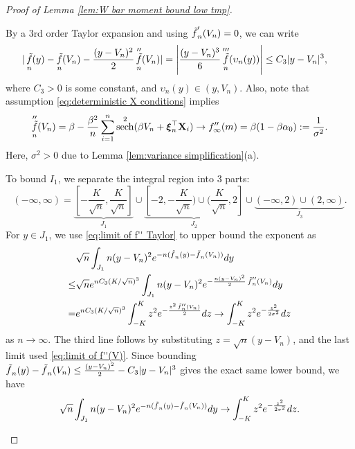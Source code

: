 \documentclass[preprint,reqno]{imsart}
\DeclareMathOperator{\ft}{\tilde{\mathnormal f}}
\DeclareMathOperator{\sech}{sech}
\newcommand{\X}{\mathbf{X}}
\newcommand{\xxi}{\boldsymbol \xi}
\DeclareMathOperator{\sumin}{\sum_{\mathnormal i=1}^{\mathnormal n}}
\begin{document}
\begin{appendix}
\begin{proof}[Proof of Lemma \ref{lem:W bar moment bound low tmp}]
\begin{enumerate}[(a)]
    By a 3rd order Taylor expansion and using $\ft_n'(V_n) = 0$, we can write
    \begin{align}\label{eq:limit of f'' Taylor}
        |\ft_n(y) - \ft_n(V_n) - \frac{(y-V_n)^2}{2} \ft_n''(V_n)| &= \left| \frac{(y-V_n)^3}{6} \ft_n'''(\upsilon_n(y)) \right| \le C_3 {|y-V_n|^3},
    \end{align}
    where $C_3 >0$ is some constant, and $\upsilon_n(y) \in (y, V_n)$.
    Also, note that assumption \eqref{eq:deterministic X conditions} implies 
    \begin{align}\label{eq:limit of f''(V)}
        \ft_n''(V_n) = \beta - \frac{\beta^2}{n} \sumin \sech^2(\beta V_n + \xxi_n^\top \X_i) \to f_{\infty}''(m) = \beta (1- \beta \alpha_0) := \frac{1}{\sigma^2}.
    \end{align} Here, $\sigma^2 > 0$ due to Lemma \ref{lem:variance simplification}(a).
    
    To bound $I_1$, we separate the integral region into 3 parts:
    $$(-\infty, \infty) = \underbrace{[-\frac{K}{\sqrt{n}},\frac{K}{\sqrt{n}}]}_{J_1} \cup \underbrace{[-2, -\frac{K}{\sqrt{n}}) \cup (\frac{K}{\sqrt{n}}, 2]}_{J_2} \cup \underbrace{(-\infty, 2) \cup (2, \infty)}_{J_3}.$$
    For $y \in J_1$, we use \eqref{eq:limit of f'' Taylor} to upper bound the exponent as
    \begin{align*}
        &\sqrt{n} \int_{J_1} n(y - V_n)^2 e^{-n(\ft_n(y) - \ft_n(V_n))} dy \\
        \le & \sqrt{n} e^{n C_3 (K/\sqrt{n})^3 } \int_{J_1} n(y - V_n)^2 e^{-\frac{n(y - V_n)^2}{2} \ft_n''(V_n)} dy \\
        =& e^{n C_3 (K/\sqrt{n})^3 } \int_{-K}^{K} z^2 e^{- \frac{z^2 \ft_n''(V_n)}{2}} dz \to \int_{-K}^{K} z^2 e^{- \frac{z^2 }{2 \sigma^2}} dz
    \end{align*}
    as $n \to \infty$.
    The third line follows by substituting $z = \sqrt{n}(y-V_n)$, and the last limit used \eqref{eq:limit of f''(V)}. Since bounding
    $\ft_n(y) - \ft_n(V_n) \le \frac{(y - V_n)^2}{2} - C_3 |y - V_n|^3$ gives the exact same lower bound, we have
    \begin{equation}\label{eq:integral J_1}
        \sqrt{n} \int_{J_1} n(y - V_n)^2 e^{-n(\ft_n(y) - \ft_n(V_n))} dy \to \int_{-K}^{K} z^2 e^{- \frac{z^2 }{2 \sigma^2}} dz.
    \end{equation}


\end{enumerate}
\end{proof}
\end{appendix}
\end{document}
